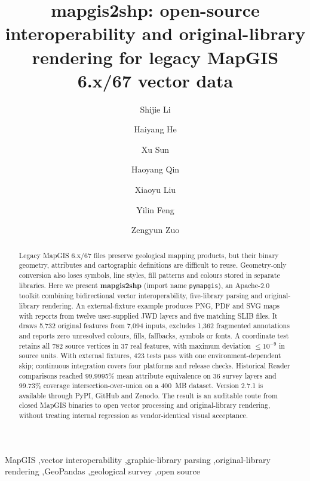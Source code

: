 \documentclass[preprint,12pt,numbers]{elsarticle}
\begin{document}
\linenumbers
\begin{frontmatter}

\title{mapgis2shp: open-source interoperability and original-library rendering for legacy MapGIS 6.x/67 vector data}

\author[1]{Shijie Li}
\author[1]{Haiyang He}
\author[1]{Xu Sun}
\author[1]{Haoyang Qin}
\author[1]{Xiaoyu Liu}
\author[1]{Yilin Feng}
\author[1]{Zengyun Zuo}


\begin{abstract}
Legacy MapGIS 6.x/67 files preserve geological mapping products, but their binary geometry, attributes and cartographic definitions are difficult to reuse. Geometry-only conversion also loses symbols, line styles, fill patterns and colours stored in separate libraries. Here we present \textbf{mapgis2shp} (import name \texttt{pymapgis}), an Apache-2.0 toolkit combining bidirectional vector interoperability, five-library parsing and original-library rendering. An external-fixture example produces PNG, PDF and SVG maps with reports from twelve user-supplied JWD layers and five matching SLIB files. It draws 5{,}732 original features from 7{,}094 inputs, excludes 1{,}362 fragmented annotations and reports zero unresolved colours, fills, fallbacks, symbols or fonts. A coordinate test retains all 782 source vertices in 37 real features, with maximum deviation $\leq 10^{-9}$ in source units. With external fixtures, 423 tests pass with one environment-dependent skip; continuous integration covers four platforms and release checks. Historical Reader comparisons reached 99.9995\% mean attribute equivalence on 36 survey layers and 99.73\% coverage intersection-over-union on a 400~MB dataset. Version 2.7.1 is available through PyPI, GitHub and Zenodo. The result is an auditable route from closed MapGIS binaries to open vector processing and original-library rendering, without treating internal regression as vendor-identical visual acceptance.
\end{abstract}

\begin{keyword}
MapGIS \sep vector interoperability \sep graphic-library parsing \sep original-library rendering \sep GeoPandas \sep geological survey \sep open source
\end{keyword}
\end{frontmatter}
\end{document}
